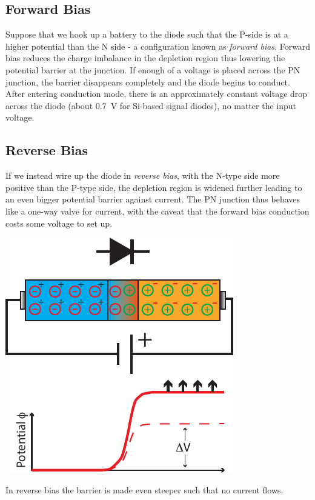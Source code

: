 \documentclass{tufte-book}
\begin{document}
\subsection{Forward Bias}
 Suppose that we hook up a battery to the diode such that the P-side is at a higher potential than the N side - a configuration known as \textit{forward bias}. Forward bias reduces the charge imbalance in the depletion region thus lowering the potential barrier at the junction. If enough of a voltage is placed across the PN junction, the barrier disappears completely and the diode begins to conduct. After entering conduction mode, there is an approximately constant voltage drop across the diode (about 0.7~V for Si-based signal diodes), no matter the input voltage.

\subsection{Reverse Bias}
 If we instead wire up the diode in \textit{reverse bias}, with the N-type side more positive than the P-type side, the depletion region is widened further leading to an even bigger potential barrier against current. The PN junction thus behaves like a one-way valve for current, with the caveat that the forward bias conduction costs some voltage to set up.

\begin{marginfigure}%
  \includegraphics[]{reverse_bias}
  \caption{In reverse bias the barrier is made even steeper such that no current flows.}
  \label{fig:REV_Bias}
\end{marginfigure}
\end{document}
